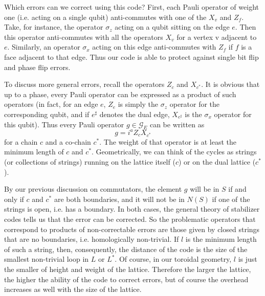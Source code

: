 \documentclass[a4paper, draft]{article}
\theoremstyle{own}
\theoremstyle{remark}
\begin{document}
Which errors can we correct using this code? First, each Pauli operator of weight one (i.e. acting on a single qubit) anti-commutes with one of the $X_v$ and $Z_f$. Take, for instance, the operator $\sigma_z$ acting on a qubit sitting on the edge $e$. Then this operator anti-commutes with all the operators $X_v$ for a vertex v adjacent to $e$. Similarly, an operator $\sigma_x$ acting on this edge anti-commutes with $Z_f$ if $f$ is a face adjacent to that edge. Thus our code is able to protect against single bit flip and phase flip errors.

To discuss more general errors, recall the operators $Z_c$ and $X_{c^*}$. It is obvious that up to a phase, every Pauli operator can be expressed as a product of such operators (in fact, for an edge $e$, $Z_e$ is simply the $\sigma_z$ operator for the corresponding qubit, and if $e^\sharp$ denotes the dual edge, $X_{e^\sharp}$ is the $\sigma_x$ operator for this qubit). Thus every Pauli operator $g \in \mathcal{G}_E$ can be written as
$$
g = i^a  Z_c X_{c^*}
$$
for a chain $c$ and a co-chain $c^*$. The weight of that operator is at least the minimum length of $c$ and $c^*$. Geometrically, we can think of the cycles as strings (or collections of strings) running on the lattice itself ($c$) or on the dual lattice ($c^*$).

By our previous discussion on commutators, the element $g$ will be in $S$ if and only if $c$ and $c^*$ are both boundaries, and it will not be in $N(S)$ if one of the strings is open, i.e. has a boundary. In both cases, the general theory of stabilizer codes tells us that the error can be corrected. So the problematic operators that correspond to products of non-correctable errors are those given by closed strings that are no boundaries, i.e. homologically non-trivial. If $l$ is the minimum length of such a string, then, consequently, the distance of the code is the size of the smallest non-trivial loop in $L$ or $L^*$. Of course, in our toroidal geometry, $l$ is just the smaller of height and weight of the lattice. Therefore the larger the lattice, the higher the ability of the code to correct errors, but of course the overhead increases as well with the size of the lattice. 
\end{document}
